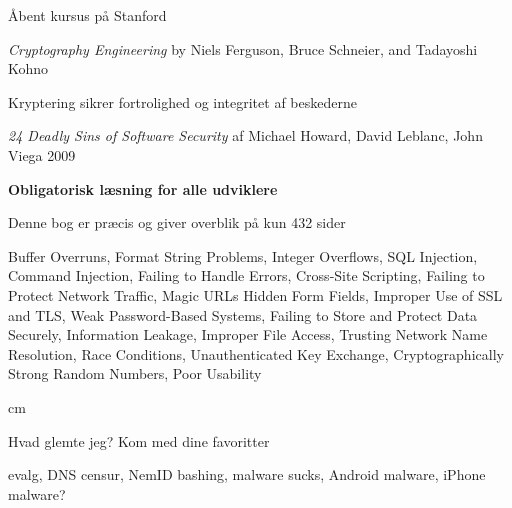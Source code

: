 \documentclass[20pt,landscape,a4paper,footrule]{foils}
\begin{document}
Åbent kursus på Stanford\\



\emph{Cryptography Engineering} by
Niels Ferguson, Bruce Schneier, and Tadayoshi Kohno

\centerline{Kryptering sikrer fortrolighed og integritet af beskederne}



\emph{24 Deadly Sins of Software Security} af Michael Howard, David Leblanc, John Viega 2009

\begin{list1}
\item {\bf Obligatorisk læsning for alle udviklere}
\item Denne bog er præcis og giver overblik på kun 432 sider
\item Buffer Overruns, Format String Problems, Integer Overflows, SQL Injection, Command Injection,
Failing to Handle Errors, Cross-Site Scripting, Failing to Protect Network Traffic, Magic URLs Hidden Form Fields,
Improper Use of SSL and TLS, Weak Password-Based Systems, Failing to Store and Protect Data Securely, Information
Leakage, Improper File Access, Trusting Network Name Resolution, Race Conditions, Unauthenticated Key Exchange, Cryptographically Strong Random Numbers, Poor Usability
\end{list1}



 cm

\centerline{\Large Hvad glemte jeg? Kom med dine favoritter \smiley}

evalg, DNS censur, NemID bashing, malware sucks, Android malware, iPhone malware?


\myquestionspage
\end{document}
